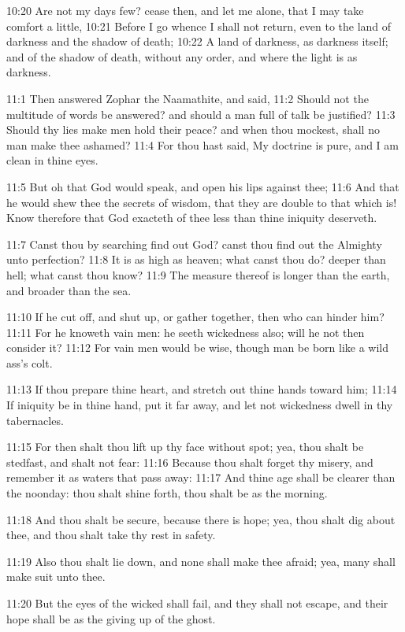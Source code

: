 10:20 Are not my days few? cease then, and let me alone, that I may take comfort a little, 10:21 Before I go whence I shall not return, even to the land of darkness and the shadow of death; 10:22 A land of darkness, as darkness itself; and of the shadow of death, without any order, and where the light is as darkness.

11:1 Then answered Zophar the Naamathite, and said, 11:2 Should not the multitude of words be answered? and should a man full of talk be justified?  11:3 Should thy lies make men hold their peace? and when thou mockest, shall no man make thee ashamed?  11:4 For thou hast said, My doctrine is pure, and I am clean in thine eyes.

11:5 But oh that God would speak, and open his lips against thee; 11:6 And that he would shew thee the secrets of wisdom, that they are double to that which is! Know therefore that God exacteth of thee less than thine iniquity deserveth.

11:7 Canst thou by searching find out God? canst thou find out the Almighty unto perfection?  11:8 It is as high as heaven; what canst thou do? deeper than hell; what canst thou know?  11:9 The measure thereof is longer than the earth, and broader than the sea.

11:10 If he cut off, and shut up, or gather together, then who can hinder him?  11:11 For he knoweth vain men: he seeth wickedness also; will he not then consider it?  11:12 For vain men would be wise, though man be born like a wild ass's colt.

11:13 If thou prepare thine heart, and stretch out thine hands toward him; 11:14 If iniquity be in thine hand, put it far away, and let not wickedness dwell in thy tabernacles.

11:15 For then shalt thou lift up thy face without spot; yea, thou shalt be stedfast, and shalt not fear: 11:16 Because thou shalt forget thy misery, and remember it as waters that pass away: 11:17 And thine age shall be clearer than the noonday: thou shalt shine forth, thou shalt be as the morning.

11:18 And thou shalt be secure, because there is hope; yea, thou shalt dig about thee, and thou shalt take thy rest in safety.

11:19 Also thou shalt lie down, and none shall make thee afraid; yea, many shall make suit unto thee.

11:20 But the eyes of the wicked shall fail, and they shall not escape, and their hope shall be as the giving up of the ghost.

